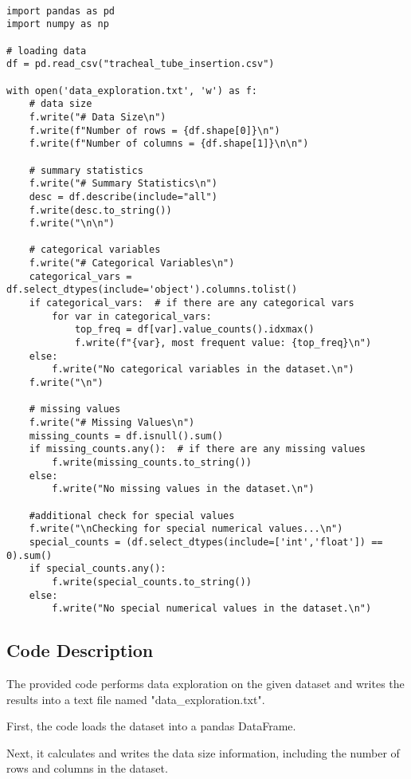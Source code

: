 \documentclass[11pt]{article}
\begin{document}
\begin{verbatim}

import pandas as pd
import numpy as np

# loading data
df = pd.read_csv("tracheal_tube_insertion.csv")

with open('data_exploration.txt', 'w') as f:
    # data size
    f.write("# Data Size\n")
    f.write(f"Number of rows = {df.shape[0]}\n")
    f.write(f"Number of columns = {df.shape[1]}\n\n")

    # summary statistics
    f.write("# Summary Statistics\n")
    desc = df.describe(include="all")
    f.write(desc.to_string())
    f.write("\n\n")

    # categorical variables
    f.write("# Categorical Variables\n")
    categorical_vars = df.select_dtypes(include='object').columns.tolist()
    if categorical_vars:  # if there are any categorical vars
        for var in categorical_vars:
            top_freq = df[var].value_counts().idxmax()
            f.write(f"{var}, most frequent value: {top_freq}\n")
    else:
        f.write("No categorical variables in the dataset.\n")
    f.write("\n")

    # missing values
    f.write("# Missing Values\n")
    missing_counts = df.isnull().sum()
    if missing_counts.any():  # if there are any missing values
        f.write(missing_counts.to_string())
    else:
        f.write("No missing values in the dataset.\n")

    #additional check for special values
    f.write("\nChecking for special numerical values...\n")
    special_counts = (df.select_dtypes(include=['int','float']) == 0).sum()
    if special_counts.any(): 
        f.write(special_counts.to_string())
    else:
        f.write("No special numerical values in the dataset.\n")

\end{verbatim}

\subsection{Code Description}

The provided code performs data exploration on the given dataset and writes the results into a text file named "data\_exploration.txt". 

First, the code loads the dataset into a pandas DataFrame. 

Next, it calculates and writes the data size information, including the number of rows and columns in the dataset.
\end{document}
